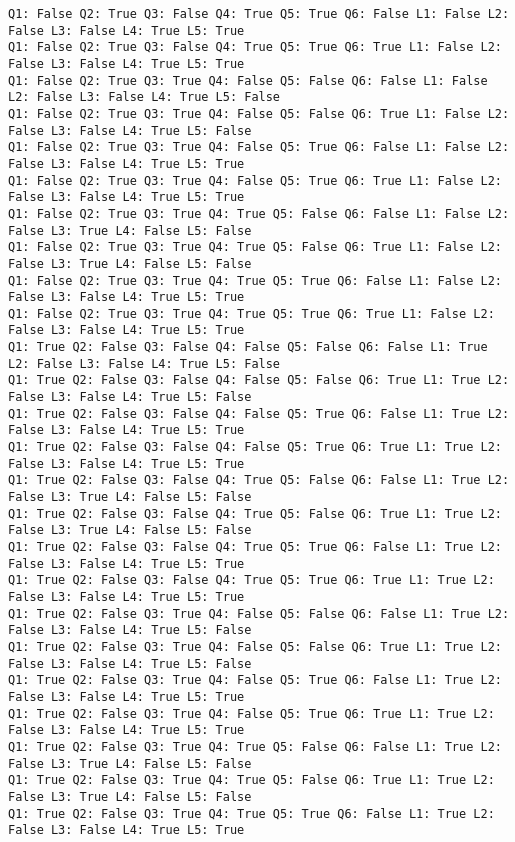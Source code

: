 \documentclass[a4paper,10pt,ngerman]{scrartcl}
\begin{document}
\begin{lstlisting}[frame=tb,breaklines=true]
Q1: False Q2: True Q3: False Q4: True Q5: True Q6: False L1: False L2: False L3: False L4: True L5: True
Q1: False Q2: True Q3: False Q4: True Q5: True Q6: True L1: False L2: False L3: False L4: True L5: True
Q1: False Q2: True Q3: True Q4: False Q5: False Q6: False L1: False L2: False L3: False L4: True L5: False 
Q1: False Q2: True Q3: True Q4: False Q5: False Q6: True L1: False L2: False L3: False L4: True L5: False
Q1: False Q2: True Q3: True Q4: False Q5: True Q6: False L1: False L2: False L3: False L4: True L5: True
Q1: False Q2: True Q3: True Q4: False Q5: True Q6: True L1: False L2: False L3: False L4: True L5: True
Q1: False Q2: True Q3: True Q4: True Q5: False Q6: False L1: False L2: False L3: True L4: False L5: False
Q1: False Q2: True Q3: True Q4: True Q5: False Q6: True L1: False L2: False L3: True L4: False L5: False
Q1: False Q2: True Q3: True Q4: True Q5: True Q6: False L1: False L2: False L3: False L4: True L5: True
Q1: False Q2: True Q3: True Q4: True Q5: True Q6: True L1: False L2: False L3: False L4: True L5: True
Q1: True Q2: False Q3: False Q4: False Q5: False Q6: False L1: True L2: False L3: False L4: True L5: False
Q1: True Q2: False Q3: False Q4: False Q5: False Q6: True L1: True L2: False L3: False L4: True L5: False
Q1: True Q2: False Q3: False Q4: False Q5: True Q6: False L1: True L2: False L3: False L4: True L5: True
Q1: True Q2: False Q3: False Q4: False Q5: True Q6: True L1: True L2: False L3: False L4: True L5: True
Q1: True Q2: False Q3: False Q4: True Q5: False Q6: False L1: True L2: False L3: True L4: False L5: False
Q1: True Q2: False Q3: False Q4: True Q5: False Q6: True L1: True L2: False L3: True L4: False L5: False
Q1: True Q2: False Q3: False Q4: True Q5: True Q6: False L1: True L2: False L3: False L4: True L5: True
Q1: True Q2: False Q3: False Q4: True Q5: True Q6: True L1: True L2: False L3: False L4: True L5: True
Q1: True Q2: False Q3: True Q4: False Q5: False Q6: False L1: True L2: False L3: False L4: True L5: False
Q1: True Q2: False Q3: True Q4: False Q5: False Q6: True L1: True L2: False L3: False L4: True L5: False
Q1: True Q2: False Q3: True Q4: False Q5: True Q6: False L1: True L2: False L3: False L4: True L5: True
Q1: True Q2: False Q3: True Q4: False Q5: True Q6: True L1: True L2: False L3: False L4: True L5: True
Q1: True Q2: False Q3: True Q4: True Q5: False Q6: False L1: True L2: False L3: True L4: False L5: False
Q1: True Q2: False Q3: True Q4: True Q5: False Q6: True L1: True L2: False L3: True L4: False L5: False
Q1: True Q2: False Q3: True Q4: True Q5: True Q6: False L1: True L2: False L3: False L4: True L5: True

\end{lstlisting}
\end{document}
